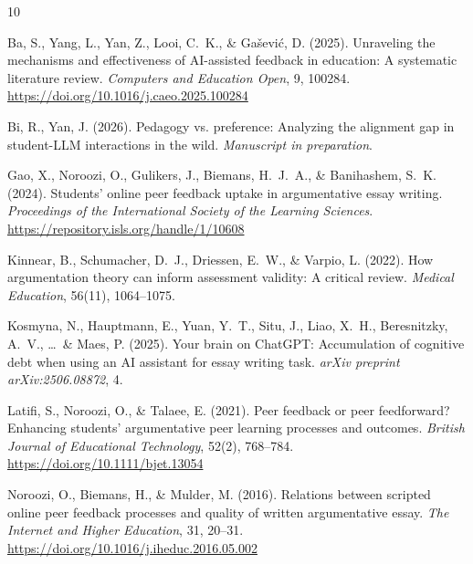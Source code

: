 \documentclass[11pt,a4paper]{article}
\begin{document}
\begin{thebibliography}{10}

Ba, S., Yang, L., Yan, Z., Looi, C.~K., \& Ga\v{s}evi\'{c}, D. (2025).
\newblock Unraveling the mechanisms and effectiveness of {AI}-assisted feedback in education: {A} systematic literature review.
\newblock \textit{Computers and Education Open}, 9, 100284.
\newblock \url{https://doi.org/10.1016/j.caeo.2025.100284}

Bi, R., Yan, J. (2026).
\newblock Pedagogy vs. preference: {A}nalyzing the alignment gap in student-{LLM} interactions in the wild.
\newblock \textit{Manuscript in preparation}.

Gao, X., Noroozi, O., Gulikers, J., Biemans, H.~J.~A., \& Banihashem, S.~K. (2024).
\newblock Students' online peer feedback uptake in argumentative essay writing.
\newblock \textit{Proceedings of the International Society of the Learning Sciences}.
\newblock \url{https://repository.isls.org/handle/1/10608}

Kinnear, B., Schumacher, D.~J., Driessen, E.~W., \& Varpio, L. (2022).
\newblock How argumentation theory can inform assessment validity: {A} critical review.
\newblock \textit{Medical Education}, 56(11), 1064--1075.

Kosmyna, N., Hauptmann, E., Yuan, Y.~T., Situ, J., Liao, X.~H., Beresnitzky, A.~V., \ldots~\& Maes, P. (2025).
\newblock Your brain on {ChatGPT}: {A}ccumulation of cognitive debt when using an {AI} assistant for essay writing task.
\newblock \textit{arXiv preprint arXiv:2506.08872}, 4.

Latifi, S., Noroozi, O., \& Talaee, E. (2021).
\newblock Peer feedback or peer feedforward? {E}nhancing students' argumentative peer learning processes and outcomes.
\newblock \textit{British Journal of Educational Technology}, 52(2), 768--784.
\newblock \url{https://doi.org/10.1111/bjet.13054}

Noroozi, O., Biemans, H., \& Mulder, M. (2016).
\newblock Relations between scripted online peer feedback processes and quality of written argumentative essay.
\newblock \textit{The Internet and Higher Education}, 31, 20--31.
\newblock \url{https://doi.org/10.1016/j.iheduc.2016.05.002}

\end{thebibliography}
\end{document}
